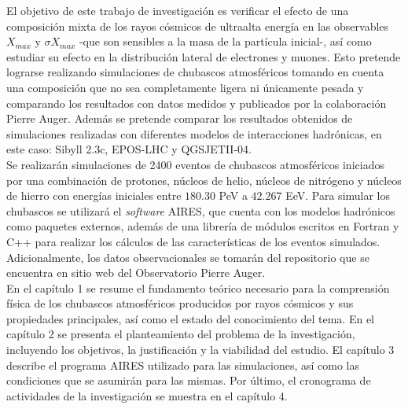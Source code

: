 El objetivo de este trabajo de investigación es verificar el efecto de una composición mixta de los rayos cósmicos de ultraalta energía en las observables $X_{max}$ y $\sigma X_{max}$ -que son sensibles a la masa de la partícula inicial-, así como estudiar su efecto en la distribución lateral de electrones y muones. Esto pretende lograrse realizando simulaciones de chubascos atmosféricos tomando en cuenta una composición que no sea completamente ligera ni únicamente pesada y comparando los resultados con datos medidos y publicados por la colaboración Pierre Auger. Además se pretende comparar los resultados obtenidos de simulaciones realizadas con diferentes modelos de interacciones hadrónicas, en este caso: Sibyll 2.3c, EPOS-LHC y QGSJETII-04. \\

Se realizarán simulaciones de 2400 eventos de chubascos atmosféricos iniciados por una combinación de protones, núcleos de helio, núcleos de nitrógeno y núcleos de hierro con energías iniciales entre $180.30$ PeV a $42.267$ EeV. Para simular los chubascos se utilizará el \textit{software} AIRES, que cuenta con los modelos hadrónicos como paquetes externos, además de una librería de módulos escritos en Fortran y C++ para realizar los cálculos de las características de los eventos simulados. Adicionalmente, los datos observacionales se tomarán del repositorio que se encuentra en sitio web del Observatorio Pierre Auger. \\

En el capítulo 1 se resume el fundamento teórico necesario para la comprensión física de los chubascos atmosféricos producidos por rayos cósmicos y sus propiedades principales, así como el estado del conocimiento del tema. En el capítulo 2 se presenta el planteamiento del problema de la investigación, incluyendo los objetivos, la justificación y la viabilidad del estudio. El capítulo 3 describe el programa AIRES utilizado para las simulaciones, así como las condiciones que se asumirán para las mismas. Por último, el cronograma de actividades de la investigación se muestra en el capítulo 4.




\singlespace